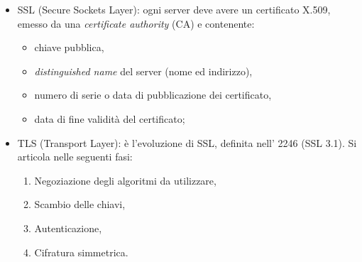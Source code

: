 \documentclass[a4paper, twoside]{article}
\def\vedi#1{\nameref{#1}}
\def\italic#1{\textit{#1}}
\begin{document}
\begin{itemize}
\item SSL (Secure Sockets Layer): ogni server deve avere un certificato X.509, emesso da una \italic{certificate authority} (CA) e contenente:
\begin{itemize}
\item chiave pubblica,
\item \italic{distinguished name} del server (nome ed indirizzo),
\item numero di serie o data di pubblicazione dei certificato,
\item data di fine validità del certificato;
\end{itemize}

\item TLS (Transport Layer): è l'evoluzione di SSL, definita nell'\vedi{RFC} 2246 (SSL 3.1). Si articola nelle seguenti fasi:
\begin{enumerate}
\item Negoziazione degli algoritmi da utilizzare,
\item Scambio delle chiavi,
\item Autenticazione,
\item Cifratura simmetrica.
\end{enumerate}
\end{itemize}
\end{document}
